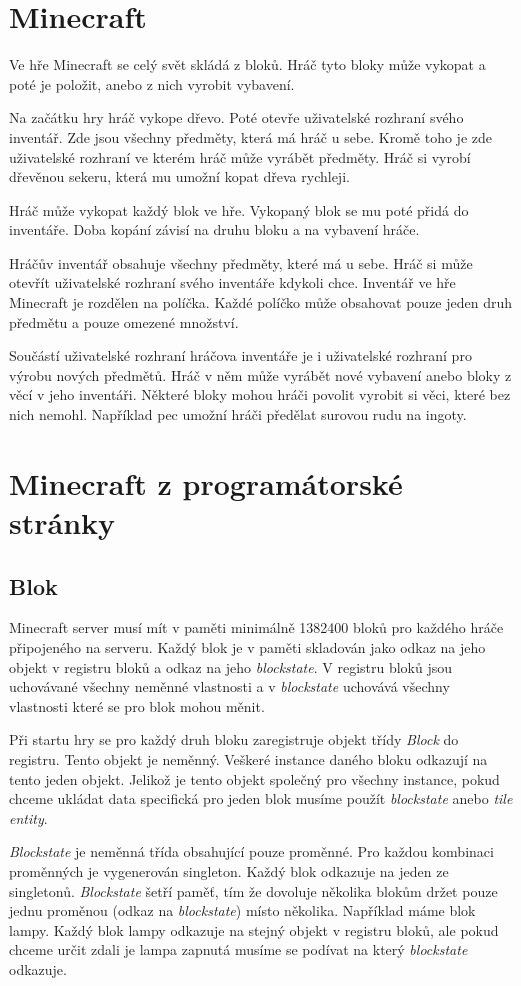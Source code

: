 \documentclass[FM,Proj,bw]{tulthesis}
\begin{document}

\chapter{Minecraft}
Ve hře Minecraft se celý svět skládá z bloků. Hráč tyto bloky může vykopat a poté je položit, anebo z nich vyrobit vybavení.
\par
Na začátku hry hráč vykope dřevo. Poté otevře uživatelské rozhraní svého inventář. Zde jsou všechny předměty, která má hráč u sebe. Kromě toho je zde uživatelské rozhraní ve kterém hráč může vyrábět předměty. Hráč si vyrobí dřevěnou sekeru, která mu umožní kopat dřeva rychleji.
\par
Hráč může vykopat každý blok ve hře. Vykopaný blok se mu poté přidá do inventáře. Doba kopání závisí na druhu bloku a na vybavení hráče.
\par
Hráčův inventář obsahuje všechny předměty, které má u sebe. Hráč si může otevřít uživatelské rozhraní svého inventáře kdykoli chce. Inventář ve hře Minecraft je rozdělen na políčka. Každé políčko může obsahovat pouze jeden druh předmětu a pouze omezené množství.
\par
Součástí uživatelské rozhraní hráčova inventáře je i uživatelské rozhraní pro výrobu nových předmětů. Hráč v něm může vyrábět nové vybavení anebo bloky z věcí v jeho inventáři. Některé bloky mohou hráči povolit vyrobit si věci, které bez nich nemohl. Například pec umožní hráči předělat surovou rudu na ingoty.  

\chapter{Minecraft z programátorské stránky}
\section{Blok}
Minecraft server musí mít v paměti minimálně 1382400 bloků pro každého hráče připojeného na serveru. Každý blok je v paměti skladován jako odkaz na jeho objekt v registru bloků a odkaz na jeho \textit{blockstate}.\cite{cooper2000java} V registru bloků jsou uchovávané všechny neměnné vlastnosti a v \textit{blockstate} uchovává všechny vlastnosti které se pro blok mohou měnit. 
\par Při startu hry se pro každý druh bloku zaregistruje objekt třídy \textit{Block} do registru. Tento objekt je neměnný. Veškeré instance daného bloku odkazují na tento jeden objekt. Jelikož je tento objekt společný pro všechny instance, pokud chceme ukládat data specifická pro jeden blok musíme použít \textit{blockstate} anebo\textit{ tile entity}.
\par \textit{Blockstate} je neměnná třída obsahující pouze proměnné. Pro každou kombinaci proměnných je vygenerován singleton. Každý blok odkazuje na jeden ze singletonů. \textit{Blockstate} šetří paměť, tím že dovoluje několika blokům držet pouze jednu proměnou (odkaz na \textit{blockstate}) místo několika. Například máme blok lampy. Každý blok lampy odkazuje na stejný objekt v registru bloků, ale pokud chceme určit zdali je lampa zapnutá musíme se podívat na který \textit{blockstate} odkazuje.
\end{document}
